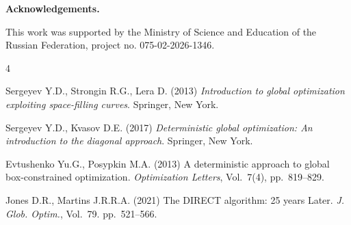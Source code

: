 \documentclass[oribibl]{llncs}
\begin{document}
\textbf{Acknowledgements.}

This work was supported by the Ministry of Science and Education of the Russian Federation, project no. 075-02-2026-1346.

 \vspace{0.5cm}

\begin{thebibliography}{4}

 Sergeyev Y.D., Strongin R.G., Lera D. (2013) \emph{Introduction to global optimization exploiting space-filling curves}. Springer, New York.

 Sergeyev Y.D., Kvasov D.E. (2017) \emph{Deterministic global optimization: An introduction to the diagonal approach}. Springer, New York.


 Evtushenko Yu.G., Posypkin M.A. (2013) A deterministic approach to global box-constrained optimization. \emph{Optimization Letters}, Vol.~7(4), pp.~819--829. 

 Jones D.R., Martins J.R.R.A. (2021) The DIRECT algorithm: 25 years Later. \emph{J. Glob. Optim.}, Vol.~79. pp.~521--566.




\end{thebibliography}
\end{document}
